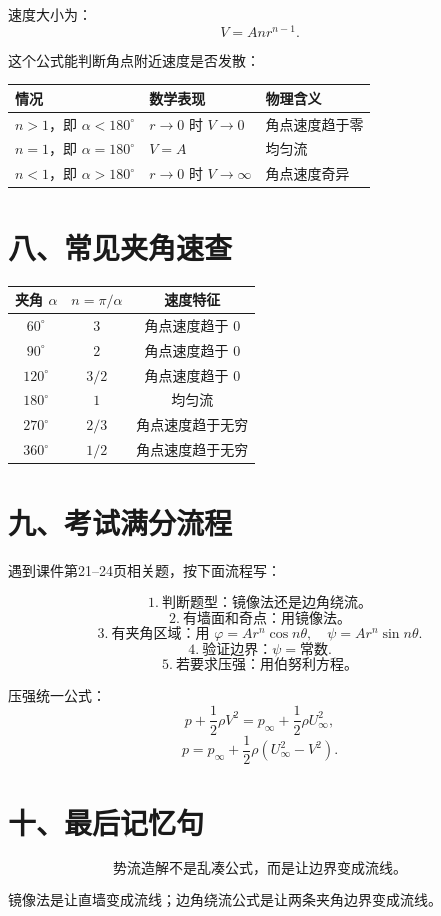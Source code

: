 \documentclass[11pt,a4paper]{ctexart}
\begin{document}
速度大小为：
\[
\boxed{V=Anr^{n-1}}.
\]

这个公式能判断角点附近速度是否发散：

\begin{center}
\begin{tabular}{lll}
\toprule
情况 & 数学表现 & 物理含义\\
\midrule
$n>1$，即 $\alpha<180^\circ$ & $r\to0$ 时 $V\to0$ & 角点速度趋于零\\
$n=1$，即 $\alpha=180^\circ$ & $V=A$ & 均匀流\\
$n<1$，即 $\alpha>180^\circ$ & $r\to0$ 时 $V\to\infty$ & 角点速度奇异\\
\bottomrule
\end{tabular}
\end{center}

\section*{八、常见夹角速查}

\begin{center}
\begin{tabular}{ccc}
\toprule
夹角 $\alpha$ & $n=\pi/\alpha$ & 速度特征\\
\midrule
$60^\circ$ & $3$ & 角点速度趋于 $0$\\
$90^\circ$ & $2$ & 角点速度趋于 $0$\\
$120^\circ$ & $3/2$ & 角点速度趋于 $0$\\
$180^\circ$ & $1$ & 均匀流\\
$270^\circ$ & $2/3$ & 角点速度趋于无穷\\
$360^\circ$ & $1/2$ & 角点速度趋于无穷\\
\bottomrule
\end{tabular}
\end{center}

\section*{九、考试满分流程}

遇到课件第21--24页相关题，按下面流程写：

\begin{tcolorbox}[colback=red!3,colframe=red!60!black,title=统一解题流程]
\[
1.\ \text{判断题型：镜像法还是边角绕流。}
\]
\[
2.\ \text{有墙面和奇点：用镜像法。}
\]
\[
3.\ \text{有夹角区域：用 } \varphi=A r^n\cos n\theta,\quad \psi=A r^n\sin n\theta.
\]
\[
4.\ \text{验证边界：}\psi=\text{常数}.
\]
\[
5.\ \text{若要求压强：用伯努利方程。}
\]
\end{tcolorbox}

压强统一公式：
\[
p+\frac12\rho V^2=p_\infty+\frac12\rho U_\infty^2,
\]
\[
\boxed{p=p_\infty+\frac12\rho(U_\infty^2-V^2)}.
\]

\section*{十、最后记忆句}

\[
\boxed{\text{势流造解不是乱凑公式，而是让边界变成流线。}}
\]

镜像法是让直墙变成流线；边角绕流公式是让两条夹角边界变成流线。
\end{document}
